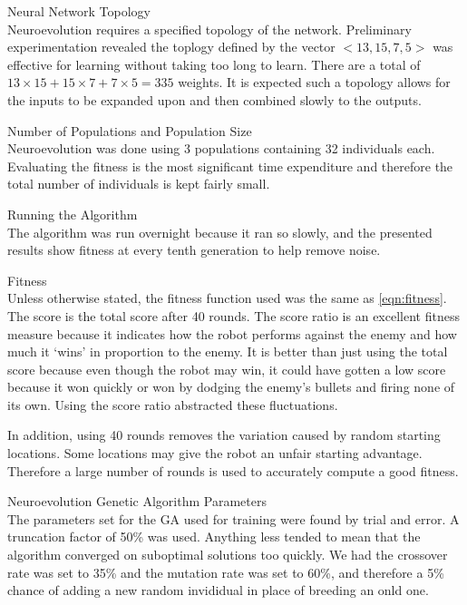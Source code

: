 \begin{description}
\item Neural Network Topology \hfill \\
Neuroevolution requires a specified topology of the network. Preliminary experimentation revealed the toplogy defined by the vector $<13, 15, 7, 5>$ was effective for learning without taking too long to learn. There are a total of $13 \times 15 + 15 \times 7 + 7 \times 5 = 335$ weights. It is expected such a topology allows for the inputs to be expanded upon and then combined slowly to the outputs.

\item Number of Populations and Population Size \hfill \\
Neuroevolution was done using 3 populations containing 32 individuals each. Evaluating the fitness is the most significant time expenditure and therefore the total number of individuals is kept fairly small. 

\item Running the Algorithm \hfill \\
The algorithm was run overnight because it ran so slowly, and the presented results show fitness at every tenth generation to help remove noise.

\item Fitness \hfill \\
Unless otherwise stated, the fitness function used was the same as \ref{eqn:fitness}. The score is the total score after 40 rounds. The score ratio is an excellent fitness measure because it indicates how the robot performs against the enemy and how much it `wins' in proportion to the enemy. It is better than just using the total score because even though the robot may win, it could have gotten a low score because it won quickly or won by dodging the enemy's bullets and firing none of its own. Using the score ratio abstracted these fluctuations. 

In addition, using 40 rounds removes the variation caused by random starting locations. Some locations may give the robot an unfair starting advantage. Therefore a large number of rounds is used to accurately compute a good fitness.

\item Neuroevolution Genetic Algorithm Parameters \hfill \\
The parameters set for the GA used for training were found by trial and error. A truncation factor of 50\% was used. Anything less tended to mean that the algorithm converged on suboptimal solutions too quickly. We had the crossover rate was set to 35\% and the mutation rate was set to 60\%, and therefore a 5\% chance of adding a new random invididual in place of breeding an onld one.


\end{description}
